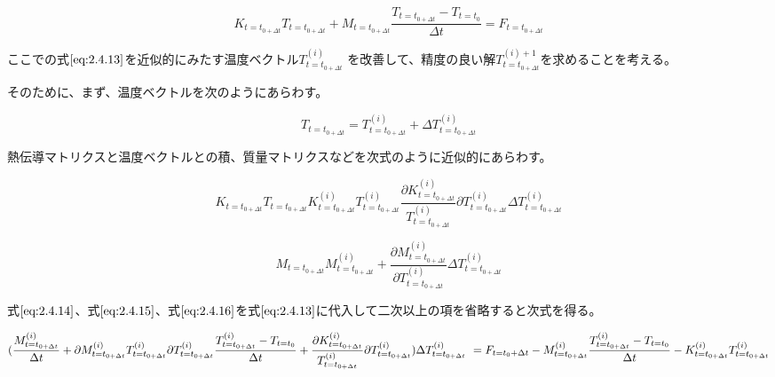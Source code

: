\documentclass[a4paper,pandoc,ja=standard]{bxjsarticle}
\begin{document}
\begin{equation}
K_{t=t_{0+\Delta t}} T_{t=t_{0+\Delta t}} + M_{t=t_{0 + \Delta t}} \frac{T_{t=t_{0 + \Delta t}} - T_{t=t_0}}{\Delta t} = F_{t=t_{0+\Delta t}}
\label{eq:2.4.13}
\end{equation}

ここでの式\(\eqref{eq:2.4.13}\)を近似的にみたす温度ベクトル\(T_{t=t_{0+\Delta t}}^{(i)}\)
を改善して、精度の良い解\(T_{t=t_{0+\Delta t}}^{(i)+1}\)を求めることを考える。

そのために、まず、温度ベクトルを次のようにあらわす。

\begin{equation}
T_{t=t_{0+\Delta t}}=
T_{t=t_{0+\Delta t}}^{(i)} + \Delta T_{t=t_{0+\Delta t}}^{(i)}
\label{eq:2.4.14}
\end{equation}

熱伝導マトリクスと温度ベクトルとの積、質量マトリクスなどを次式のように近似的にあらわす。

\begin{equation}
K_{t=t_{0+\Delta t}} T_{t=t_{0+\Delta t}}
K_{t=t_{0+\Delta t}}^{(i)} T_{t=t_{0+\Delta t}}^{(i)}
\frac{\partial K_{t=t_{0+\Delta t}}^{(i)}}{T_{t=t_{0+\Delta t}}^{(i)}}
\partial T_{t=t_{0+\Delta t}}^{(i)} \Delta T_{t=t_{0+\Delta t}}^{(i)}
\label{eq:2.4.15}
\end{equation}

\begin{equation}
M_{t=t_{0+\Delta t}}
M_{t=t_{0+\Delta t}}^{(i)}
+ \frac{\partial M_{t=t_{0+\Delta t}}^{(i)}}{\partial T_{t=t_{0+\Delta t}}^{(i)}}
\Delta T_{t=t_{0+\Delta t}}^{(i)}
\label{eq:2.4.16}
\end{equation}

式\(\eqref{eq:2.4.14}\)、式\(\eqref{eq:2.4.15}\)、式\(\eqref{eq:2.4.16}\)を式\(\eqref{eq:2.4.13}\)に代入して二次以上の項を省略すると次式を得る。

\begin{equation}
(\frac{M_{t=t_{0+\Delta t}}^{(i)}}{\Delta t}
+ \partial M_{t=t_{0+\Delta t}}^{(i)} T_{t=t_{0+\Delta t}}^{(i)}
\partial T_{t=t_{0+\Delta t}}^{(i)}
\frac{T_{t=t_{0+\Delta t}}^{(i)} - T_{t=t_0}}{\Delta t}
+ \frac{\partial K_{t=t_{0+\Delta t}}^{(i)}}{T_{t=t_{0+\Delta t}}^{(i)}}
\partial T_{t=t_{0+\Delta t}}^{(i)})
\Delta T_{t=t_{0+\Delta t}}^{(i)} \\\ 
= F_{t=t_0+\Delta t} - M_{t=t_{0+\Delta t}}^{(i)}
\frac{T_{t=t_{0+\Delta t}}^{(i)} - T_{t=t_0}}{\Delta t}
- K_{t=t_{0+\Delta t}}^{(i)} T_{t=t_{0+\Delta t}}^{(i)}
\label{eq:2.4.17}
\end{equation}
\end{document}
